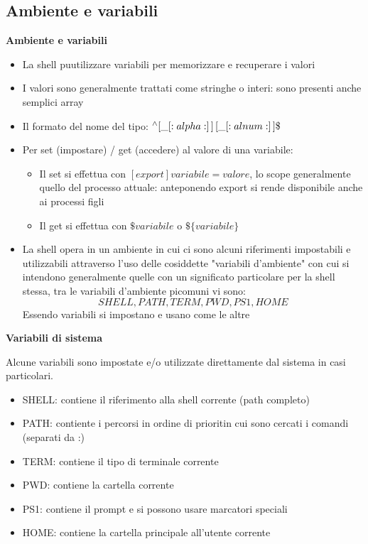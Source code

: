 \subsection{Ambiente e variabili}
\begin{flushleft}
  \textbf{Ambiente e variabili}\par 
  \begin{itemize}
    \item La shell pu\aco utilizzare variabili per memorizzare e recuperare i valori 
    \item I valori sono generalmente trattati come stringhe o interi: sono presenti anche semplici array
    \item Il formato del nome \ace del tipo: $^{\wedge}[\_[:alpha:]\,]\,[\_[:alnum:]\,]\*\$$
    \item Per set (impostare) / get (accedere) al valore di una variabile: 
          \begin{itemize}
            \item Il set si effettua con $[export] variabile=valore$, lo scope \ace generalmente quello 
                  del processo attuale: anteponendo export si rende disponibile anche ai processi figli 
            \item Il get si effettua con $\$variabile$ o $\$\{variabile\}$
          \end{itemize}
    \item La shell opera in un ambiente in cui ci sono alcuni riferimenti impostabili e utilizzabili
          attraverso l'uso delle cosiddette "variabili d'ambiente" con cui si intendono generalmente quelle
          con un significato particolare per la shell stessa, tra le variabili d'ambiente pi\acu comuni vi sono:
          $$SHELL, PATH, TERM, PWD, PS1, HOME$$
          Essendo variabili si impostano e usano come le altre
  \end{itemize}
  \textbf{Variabili di sistema} \par 
  Alcune variabili sono impostate e/o utilizzate direttamente dal sistema in casi particolari. 
  \begin{itemize}
    \item SHELL: contiene il riferimento alla shell corrente (path completo)
    \item PATH: contiente i percorsi in ordine di priorit\aca in cui sono cercati i comandi (separati da :)
    \item TERM: contiene il tipo di terminale corrente
    \item PWD: contiene la cartella corrente
    \item PS1: contiene il prompt e si possono usare marcatori speciali
    \item HOME: contiene la cartella principale all'utente corrente
  \end{itemize}
\end{flushleft}
